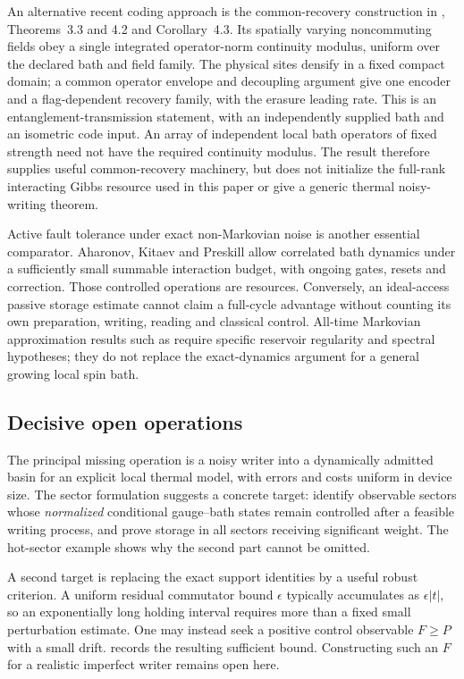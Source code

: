 \documentclass[11pt,reqno]{amsart}
\numberwithin{equation}{section}
\theoremstyle{definition}
\theoremstyle{remark}
\begin{document}
An alternative recent coding approach is the common-recovery construction
in \cite{NE26},
Theorems~3.3 and 4.2 and Corollary~4.3.
Its spatially varying noncommuting fields obey a single integrated
operator-norm continuity modulus, uniform over the declared bath and field
family. The physical sites densify in a fixed compact domain; a common
operator envelope and decoupling argument give one encoder and a
flag-dependent recovery family, with the erasure leading rate.
This is an entanglement-transmission statement, with an independently
supplied bath and an isometric code input. An array of independent local
bath operators of fixed strength need not have the required continuity
modulus. The result therefore supplies useful common-recovery machinery,
but does not initialize the full-rank interacting Gibbs resource used
in this paper or give a generic thermal noisy-writing theorem.

Active fault tolerance under exact non-Markovian noise is another
essential comparator. Aharonov, Kitaev and Preskill \cite{AKP06}
allow correlated bath dynamics under a sufficiently small summable
interaction budget, with ongoing gates, resets and correction.
Those controlled operations are resources. Conversely, an ideal-access
passive storage estimate cannot claim a full-cycle advantage without
counting its own preparation, writing, reading and classical control.
All-time Markovian approximation results such as
\cite[Theorem~1.1]{Merkli22} require specific reservoir regularity and
spectral hypotheses; they do not replace the exact-dynamics argument
for a general growing local spin bath.

\subsection{Decisive open operations}

The principal missing operation is a noisy writer into a dynamically
admitted basin for an explicit local thermal model, with errors and
costs uniform in device size. The sector formulation suggests a concrete
target: identify observable sectors whose \emph{normalized} conditional
gauge--bath states remain controlled after a feasible writing process,
and prove storage in all sectors receiving significant weight.
The hot-sector example shows why the second part cannot be omitted.

A second target is replacing the exact support identities by a useful
robust criterion. A uniform residual commutator bound \(\epsilon\)
typically accumulates as \(\epsilon|t|\), so an exponentially long
holding interval requires more than a fixed small perturbation estimate.
One may instead seek a positive control observable \(F\ge P\) with a
small drift.  records the resulting sufficient
bound. Constructing such an \(F\) for a realistic imperfect writer
remains open here.
\end{document}
